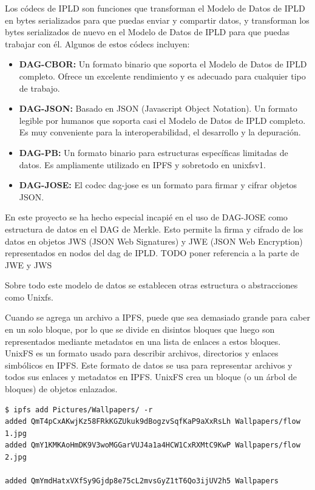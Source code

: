 Los códecs de IPLD son funciones que transforman el Modelo de Datos de IPLD en bytes serializados para que puedas enviar y compartir datos, y transforman los
bytes serializados de nuevo en el Modelo de Datos de IPLD para que puedas trabajar con él. Algunos de estos códecs incluyen:

\begin{itemize}[itemsep=1pt,nolistsep]
      \item \textbf{DAG-CBOR:} Un formato binario que soporta el Modelo de Datos de IPLD completo. Ofrece un excelente rendimiento y es adecuado para cualquier tipo de trabajo.
      \item \textbf{DAG-JSON:} Basado en JSON (Javascript Object Notation). Un formato legible por humanos que soporta casi el Modelo de Datos de IPLD completo. Es muy conveniente para la interoperabilidad, el desarrollo y la depuración.
      \item \textbf{DAG-PB:} Un formato binario para estructuras específicas limitadas de datos. Es ampliamente utilizado en IPFS y sobretodo en unixfsv1.
      \item \textbf{DAG-JOSE:} El codec dag-jose es un formato para firmar y cifrar objetos JSON.
\end{itemize}

En este proyecto se ha hecho especial incapié en el uso de DAG-JOSE como estructura de datos en el DAG de Merkle. Esto permite la firma y cifrado de los datos
en objetos JWS (JSON Web Signatures) y JWE (JSON Web Encryption) representados en nodos del dag de IPLD.
TODO poner referencia a la parte de JWE y JWS

Sobre todo este modelo de datos se establecen otras estructura o abstracciones como Unixfs.

Cuando se agrega un archivo a IPFS, puede que sea demasiado grande para caber en un solo bloque, por lo que se divide en disintos bloques que luego son
representados mediante metadatos en una lista de enlaces a estos bloques. UnixFS es un formato usado para describir archivos, directorios y enlaces simbólicos en
IPFS. Este formato de datos se usa para representar archivos y todos sus enlaces y metadatos en IPFS. UnixFS crea un bloque (o un árbol de bloques) de objetos enlazados.

\begin{verbatim}
$ ipfs add Pictures/Wallpapers/ -r
added QmT4pCxAKwjKz58FRkKGZUkuk9dBogzvSqfKaP9aXxRsLh Wallpapers/flow 1.jpg
added QmY1KMKAoHmDK9V3woMGGarVUJ4a1a4HCW1CxRXMtC9KwP Wallpapers/flow 2.jpg

added QmYmdHatxVXfSy9Gjdp8e75cL2mvsGyZ1tT6Qo3ijUV2h5 Wallpapers
\end{verbatim}


